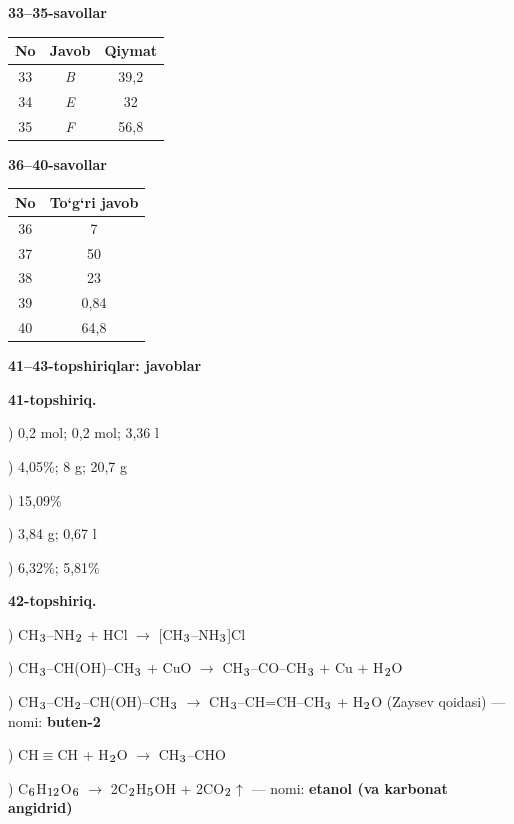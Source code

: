 \documentclass[11pt,a4paper]{article}
\renewcommand{\textsubscript}[1]{\ensuremath{_{\text{\fontsize{8}{8}\selectfont #1}}}}
\begin{document}
\noindent\textbf{33--35-savollar}\par\smallskip
\noindent\begin{tabular}{|c|c|c|}\hline \textbf{No} & \textbf{Javob} & \textbf{Qiymat}\\\hline
33 & \textsl{B} & 39,2\\\hline
34 & \textsl{E} & 32\\\hline
35 & \textsl{F} & 56,8\\\hline
\end{tabular}\par\medskip
\noindent\textbf{36--40-savollar}\par\smallskip
\noindent\begin{tabular}{|c|c|}\hline \textbf{No} & \textbf{To`g`ri javob}\\\hline
36 & 7\\\hline
37 & 50\\\hline
38 & 23\\\hline
39 & 0,84\\\hline
40 & 64,8\\\hline
\end{tabular}\par\medskip
\noindent\textbf{41--43-topshiriqlar: javoblar}\par\smallskip
\noindent\textbf{41-topshiriq.}\par
{}) 0,2 mol; 0,2 mol; 3,36 l\par
{}) 4,05\%; 8 g; 20,7 g\par
{}) 15,09\%\par
{}) 3,84 g; 0,67 l\par
{}) 6,32\%; 5,81\%\par
\noindent\textbf{42-topshiriq.}\par
{}) CH\textsubscript{3}--NH\textsubscript{2} + HCl $\to$ [CH\textsubscript{3}--NH\textsubscript{3}]Cl\par
{}) CH\textsubscript{3}--CH(OH)--CH\textsubscript{3} + CuO $\to$ CH\textsubscript{3}--CO--CH\textsubscript{3} + Cu + H\textsubscript{2}O\par
{}) CH\textsubscript{3}--CH\textsubscript{2}--CH(OH)--CH\textsubscript{3} $\to$ CH\textsubscript{3}--CH=CH--CH\textsubscript{3} + H\textsubscript{2}O (Zaysev qoidasi) --- nomi: \textbf{buten-2}\par
{}) CH$\equiv$CH + H\textsubscript{2}O $\to$ CH\textsubscript{3}--CHO\par
{}) C\textsubscript{6}H\textsubscript{12}O\textsubscript{6} $\to$ 2C\textsubscript{2}H\textsubscript{5}OH + 2CO\textsubscript{2}$\uparrow$ --- nomi: \textbf{etanol (va karbonat angidrid)}\par
\end{document}
